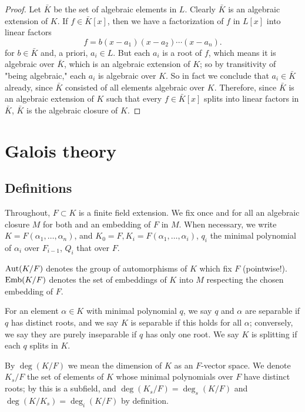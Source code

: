 \begin{proof}
Let $ \bar{K}$ be the set of algebraic elements in $ L$. Clearly $ \bar{K}$ is an algebraic extension of $ K$. If $ f \in \bar{K}[x]$, then we have a factorization of $ f$ in $ L[x]$ into linear factors
\[ f = b(x - a_1)(x - a_2) \dotsb (x - a_n). \]
for $ b \in \bar{K}$ and, a priori, $ a_i \in L$. But each $ a_i$ is a root of $ f$, which means it is algebraic over $ \bar{K}$, which is an algebraic extension of $ K$; so by transitivity of "being algebraic," each $ a_i$ is algebraic over $ K$. So in fact we conclude that $ a_i \in \bar{K}$ already, since $ \bar{K}$ consisted of all elements algebraic over $ K$. Therefore, since $ \bar{K}$ is an algebraic extension of $ K$ such that every $ f \in \bar{K}[x]$ splits into linear factors in $ \bar{K}$, $ \bar{K}$ is the algebraic closure of $ K$.

\end{proof}

\section{Galois theory}
\subsection{Definitions}

Throughout, $F \subset K$ is a finite field extension.  We fix once and for
all an algebraic closure $M$ for both and an embedding of $F$ in $M$.  When
necessary, we write $K = F(\alpha_1, \dots, \alpha_n)$, and $K_0 = F, K_i =
F(\alpha_1, \dots, \alpha_i)$, $q_i$ the minimal polynomial of $\alpha_i$ over
$F_{i - 1}$, $Q_i$ that over $F$.

\begin{definition} $\operatorname{\text{Aut}}(K/F)$ denotes the group of automorphisms of $K$ which fix
$F$ (pointwise!).  $\operatorname{\text{Emb}}(K/F)$ denotes the set of embeddings of $K$ into $M$
respecting the chosen embedding of $F$.
\label{def:gal}
\end{definition}

\begin{definition} For an element $\alpha \in K$ with minimal polynomial $q$, we say
$q$ and $\alpha$ are separable if $q$ has distinct roots, and we say $K$ is
separable if this holds for all $\alpha$; conversely, we say they are purely
inseparable if $q$ has only one root.  We say $K$ is splitting if each $q$
splits in $K$.
\label{def:sepsplit}
\end{definition}

\begin{definition} By $\deg(K/F)$ we mean the dimension of $K$ as an $F$-vector
space.  We denote $K_s/F$ the set of elements of $K$ whose minimal polynomials
over $F$ have distinct roots; by  this is a subfield, and
$\deg(K_s/F) = \deg_s(K/F)$ and $\deg(K/K_s) = \deg_i(K/F)$ by definition.
\label{def:sep}
\end{definition}


